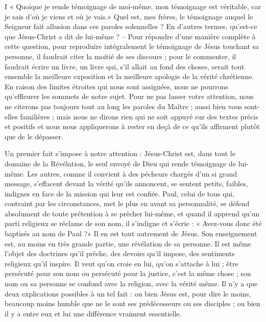 I
« Quoique je rende témoignage de moi-même, mon témoignage est véritable, car je sais d’où je viens et où je vais.» Quel est, mes frères, le témoignage auquel le Seigneur fait allusion dans ces paroles solennelles ? En d’autres termes, qu’est-ce que Jésus-Christ a dit de lui-même ? – Pour répondre d’une manière complète à cette question, pour reproduire intégralement le témoignage de Jésus touchant sa personne, il faudrait citer la moitié de ses discours ; pour le commenter, il faudrait écrire un livre, un livre qui, s’il allait au fond des choses, serait tout ensemble la meilleure exposition et la meilleure apologie de la vérité chrétienne. En raison des limites étroites qui nous sont assignées, nous ne pourrons qu’effleurer les sommets de notre sujet. Pour ne pas lasser votre attention, nous ne citerons pas toujours tout au long les paroles du Maître ; aussi bien vous sont-elles familières ; mais nous ne dirons rien qui ne soit appuyé sur des textes précis et positifs et nous nous appliquerons à rester en deçà de ce qu’ils affirment plutôt que de le dépasser.

Un premier fait s’impose à notre attention : Jésus-Christ est, dans tout le domaine de la Révélation, le seul envoyé de Dieu qui rende témoignage de lui-même. Les autres, comme il convient à des pécheurs chargés d’un si grand message, s’effacent devant la vérité qu’ils annoncent, se sentent petits, faibles, indignes en face de la mission qui leur est confiée. Paul, celui de tous qui, contraint par les circonstances, met le plus en avant sa personnalité, se défend absolument de toute prétention à se prêcher lui-même, et quand il apprend qu’un parti religieux se réclame de son nom, il s’indigne et s’écrie : « Avez-vous donc été baptisés au nom de Paul ?» Il en est tout autrement de Jésus. Son enseignement est, au moins en très grande partie, une révélation de sa personne. Il est même l’objet des doctrines qu’il prêche, des devoirs qu’il impose, des sentiments religieux qu’il inspire. Il veut qu’on croie en lui, qu’on s’attache à lui ; être persécuté pour son nom ou persécuté pour la justice, c’est la même chose ; son nom ou sa personne se confond avec la religion, avec la vérité même. Il n’y a que deux explications possibles à un tel fait : ou bien Jésus est, pour dire le moins, beaucoup moins humble que ne le sont ses prédécesseurs ou ses disciples ; ou bien il y a entre eux et lui une différence vraiment essentielle.

